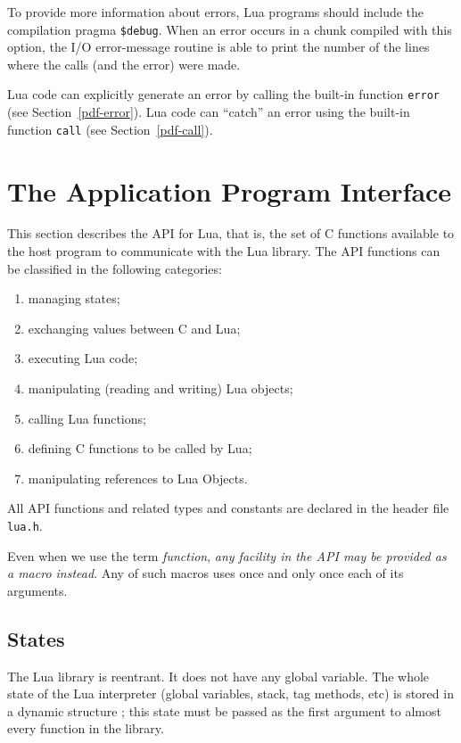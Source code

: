 \documentclass[11pt]{article}
\newcommand{\See}[1]{Section~\ref{#1}}
\newcommand{\see}[1]{(see \See{#1})}
\newcommand{\Deffunc}[1]{\index{#1}}
\begin{document}
To provide more information about errors,
Lua programs should include the compilation pragma \verb|$debug|.
\label{pragma}
When an error occurs in a chunk compiled with this option,
the I/O error-message routine is able to print the number of the
lines where the calls (and the error) were made.

Lua code can explicitly generate an error by calling the built-in
function \verb|error| \see{pdf-error}.
Lua code can ``catch'' an error using the built-in function
\verb|call| \see{pdf-call}.



\section{The Application Program Interface}

This section describes the API for Lua, that is,
the set of C functions available to the host program to communicate
with the Lua library.
The API functions can be classified in the following categories:
\begin{enumerate}
\item managing states;
\item exchanging values between C and Lua;
\item executing Lua code;
\item manipulating (reading and writing) Lua objects;
\item calling Lua functions;
\item defining C functions to be called by Lua;
\item manipulating references to Lua Objects.
\end{enumerate}
All API functions and related types and constants
are declared in the header file \verb|lua.h|.

Even when we use the term \emph{function},
\emph{any facility in the API may be provided as a macro instead}.
Any of such macros uses once and only once each of its arguments.


\subsection{States} \label{mangstate}

The Lua library is reentrant.
It does not have any global variable.
The whole state of the Lua interpreter
(global variables, stack, tag methods, etc)
is stored in a dynamic structure \Deffunc{lua_State};
this state must be passed as the first argument to almost
every function in the library.
\end{document}
